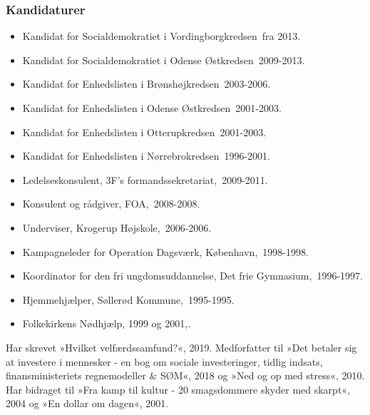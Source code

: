 \documentclass[11pt, a4paper]{awesome-cv}
\begin{document}
\begin{cvletter}
\subsubsection*{Kandidaturer}
\begin{itemize}
\item Kandidat for Socialdemokratiet i Vordingborgkredsen fra 2013.
\item Kandidat for Socialdemokratiet i Odense Østkredsen 2009-2013.
\item Kandidat for Enhedslisten i Brønshøjkredsen 2003-2006.
\item Kandidat for Enhedslisten i Odense Østkredsen 2001-2003.
\item Kandidat for Enhedslisten i Otterupkredsen 2001-2003.
\item Kandidat for Enhedslisten i Nørrebrokredsen 1996-2001.
\end{itemize}
\begin{itemize}
\item Ledelseskonsulent, 3F's formandssekretariat, 2009-2011.
\item Konsulent og rådgiver, FOA, 2008-2008.
\item Underviser, Krogerup Højskole, 2006-2006.
\item Kampagneleder for Operation Dagsværk, København, 1998-1998.
\item Koordinator for den fri ungdomsuddannelse, Det frie Gymnasium, 1996-1997.
\item Hjemmehjælper, Søllerød Kommune, 1995-1995.
\item Folkekirkens Nødhjælp, 1999 og 2001,.
\end{itemize}
Har skrevet »Hvilket velfærdssamfund?«, 2019. Medforfatter til »Det betaler sig at investere i mennesker - en bog om sociale investeringer, tidlig indsats, finansministeriets regnemodeller \& SØM«, 2018 og »Ned og op med stress«, 2010. Har bidraget til »Fra kamp til kultur - 20 smagsdommere skyder med skarpt«, 2004 og »En dollar om dagen«, 2001.

\end{cvletter}
\end{document}
